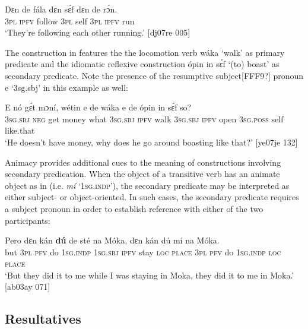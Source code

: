 \ea%
    \label{ex:key:1599}
    \gll Dɛn  de  fála    dɛn  sɛ́f  dɛn  de  rɔ́n.\\
\textsc{3pl}  \textsc{ipfv}  follow  \textsc{3pl}  self  \textsc{3pl}  \textsc{ipfv}  run\\

\glt ‘They’re following each other running.’ [dj07re 005]
\z

The construction in  features the the locomotion verb wáka ‘walk’ as primary predicate and the idiomatic reflexive construction ópin in sɛ́f ‘(to) boast’ as secondary predicate. Note the presence of the resumptive subject[FFF9?] pronoun e ‘3sg.sbj’ in this example as well: 


\ea%
    \label{ex:key:1600}
    \gll E    nó  gɛ́t  mɔní,  wétin  e    de  wáka
e    de  ópin  in    sɛ́f  so?\\
\textsc{3sg.sbj}  \textsc{neg}  get  money  what  \textsc{3sg.sbj}  \textsc{ipfv}  walk
\textsc{3sg.sbj}  \textsc{ipfv}  open  \textsc{3sg.poss}  self  like.that\\

\glt ‘He doesn’t have money, why does he go around boasting like that?’ [ye07je 132]
\z

Animacy provides additional cues to the meaning of constructions involving secondary predication. When the object of a transitive verb has an animate object as in  (i.e. \textit{mí} ‘\textsc{1sg.indp’),} the secondary predicate may be interpreted as either subject- or object-oriented. In such cases, the secondary predicate requires a subject pronoun in order to establish reference with either of the two participants:


\ea%
    \label{ex:key:1601}
    \gll Pero    dɛn  kán  \textbf{dú}          de  sté  na  Móka,  
dɛn  kán  dú  mí    na  Móka.\\
but    \textsc{3pl}  \textsc{pfv}  do  \textsc{1sg.indp}  \textsc{1sg.sbj}  \textsc{ipfv}  stay  \textsc{loc}  \textsc{place}  
\textsc{3pl}  \textsc{pfv}  do  \textsc{1sg.indp}  \textsc{loc}  \textsc{place}\\

\glt ‘But they did it to me while I was staying in Moka, they did it to 
me in Moka.’ [ab03ay 071]
\z

\subsection{Resultatives}\label{sec:11.3.3}

